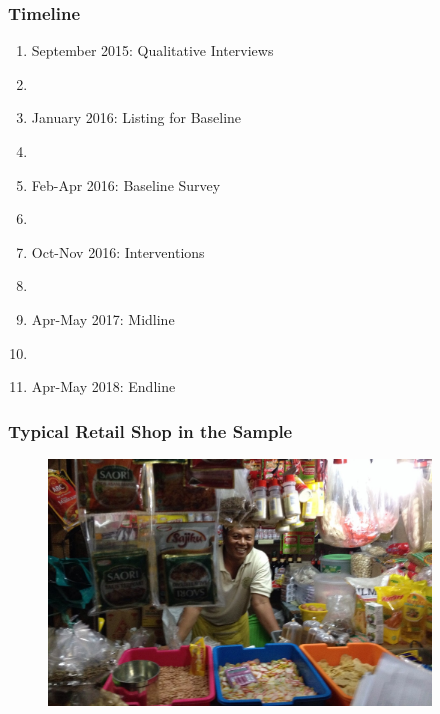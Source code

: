 \documentclass[hideothersubsections, usenames,dvipsnames,10pt]{beamer}
\begin{document}
\begin{frame}
\frametitle{Timeline}
\begin{enumerate}
    \item September 2015: \textcolor[rgb]{0.00,0.07,1.00}{Qualitative} Interviews
    \item[]
    \item January 2016: \textcolor[rgb]{0.00,0.07,1.00}{Listing} for Baseline
    \item[]
    \item Feb-Apr 2016: \textcolor[rgb]{0.00,0.07,1.00}{Baseline} Survey
    \item[]
    \item Oct-Nov 2016: \textcolor[rgb]{0.00,0.07,1.00}{Interventions}
    \item[]
    \item Apr-May 2017: \textcolor[rgb]{0.00,0.07,1.00}{Midline}
    \item[]
    \item Apr-May 2018: \textcolor[rgb]{0.00,0.07,1.00}{Endline}
\end{enumerate}
\end{frame}


\begin{frame}
\frametitle{Typical Retail Shop in the Sample}

\begin{figure}[htbp]
	\centering
		\includegraphics[width=4in]{pics/retailer1.jpg}
	\label{height}
\end{figure}
\end{frame}
\end{document}
